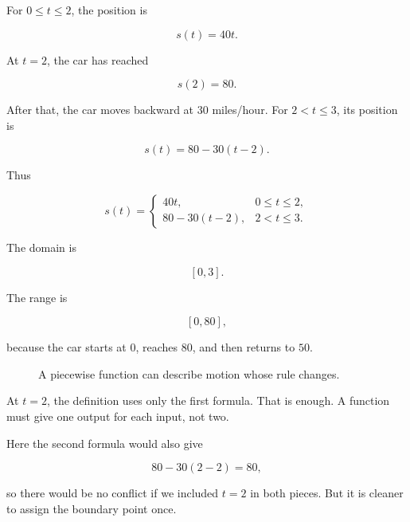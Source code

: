 For \(0\le t\le 2\), the position is

\[
s(t)=40t.
\]

At \(t=2\), the car has reached

\[
s(2)=80.
\]

After that, the car moves backward at \(30\) miles/hour. For \(2<t\le 3\), its position is

\[
s(t)=80-30(t-2).
\]

Thus

\[
s(t)=
\begin{cases}
40t, & 0\le t\le 2,\\
80-30(t-2), & 2<t\le 3.
\end{cases}
\]

The domain is

\[
[0,3].
\]

The range is

\[
[0,80],
\]

because the car starts at \(0\), reaches \(80\), and then returns to \(50\).

\begin{figure}[h]
\centering
{}
\caption{A piecewise function can describe motion whose rule changes.}
\label{fig:piecewise-position-function}
\end{figure}

At \(t=2\), the definition uses only the first formula. That is enough. A function must give one output for each input, not two.

Here the second formula would also give

\[
80-30(2-2)=80,
\]

so there would be no conflict if we included \(t=2\) in both pieces. But it is cleaner to assign the boundary point once.

